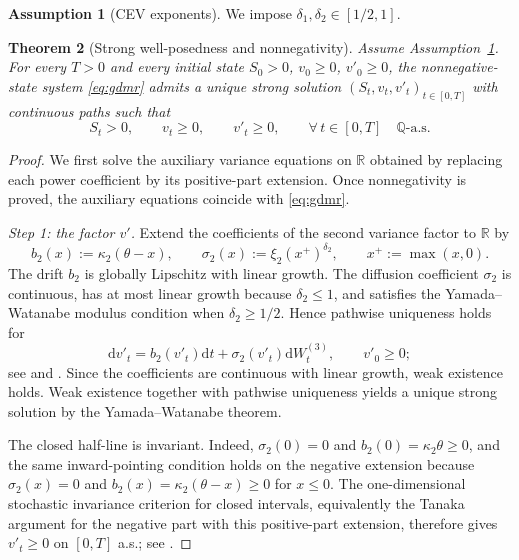 \documentclass[10pt]{article}
\theoremstyle{plain}
\newtheorem{theorem}{Theorem}[section]
\theoremstyle{definition}
\newtheorem{assumption}[theorem]{Assumption}
\theoremstyle{remark}
\newcommand{\dd}{\mathrm d}
\newcommand{\Q}{\mathbb Q}
\newcommand{\R}{\mathbb R}
\begin{document}
\begin{assumption}[CEV exponents]\label{ass:delta-range}
We impose $\delta_1,\delta_2\in[1/2,1]$.
\end{assumption}

\begin{theorem}[Strong well-posedness and nonnegativity]\label{thm:wellposed}
Assume Assumption~\ref{ass:delta-range}. For every $T>0$ and every initial state $S_0>0$, $v_0\ge0$, $v'_0\ge0$, the nonnegative-state system \eqref{eq:gdmr} admits a unique strong solution $(S_t,v_t,v'_t)_{t\in[0,T]}$ with continuous paths such that
\[
S_t>0,\qquad v_t\ge 0,\qquad v'_t\ge 0,\qquad \forall\,t\in[0,T]\quad \Q\text{-a.s.}
\]
\end{theorem}

\begin{proof}
We first solve the auxiliary variance equations on $\R$ obtained by replacing each power coefficient by its positive-part extension. Once nonnegativity is proved, the auxiliary equations coincide with \eqref{eq:gdmr}.

\emph{Step 1: the factor $v'$.}
Extend the coefficients of the second variance factor to $\R$ by
\[
b_2(x):=\kappa_2(\theta-x),\qquad \sigma_2(x):=\xi_2(x^+)^{\delta_2},\qquad x^+:=\max(x,0).
\]
The drift $b_2$ is globally Lipschitz with linear growth. The diffusion coefficient $\sigma_2$ is continuous, has at most linear growth because $\delta_2\le1$, and satisfies the Yamada--Watanabe modulus condition when $\delta_2\ge1/2$. Hence pathwise uniqueness holds for
\[
\dd v'_t=b_2(v'_t)\dd t+\sigma_2(v'_t)\dd W^{(3)}_t,\qquad v'_0\ge 0;
\]
see \cite{yamada1971uniqueness} and \cite[Ch.~5]{karatzas1991brownian}. Since the coefficients are continuous with linear growth, weak existence holds. Weak existence together with pathwise uniqueness yields a unique strong solution by the Yamada--Watanabe theorem.

\noindent
The closed half-line is invariant. Indeed, $\sigma_2(0)=0$ and $b_2(0)=\kappa_2\theta\ge0$, and the same inward-pointing condition holds on the negative extension because $\sigma_2(x)=0$ and $b_2(x)=\kappa_2(\theta-x)\ge0$ for $x\le0$. The one-dimensional stochastic invariance criterion for closed intervals, equivalently the Tanaka argument for the negative part with this positive-part extension, therefore gives $v'_t\ge0$ on $[0,T]$ a.s.; see \cite[Ch.~5]{karatzas1991brownian}.


\end{proof}
\end{document}
